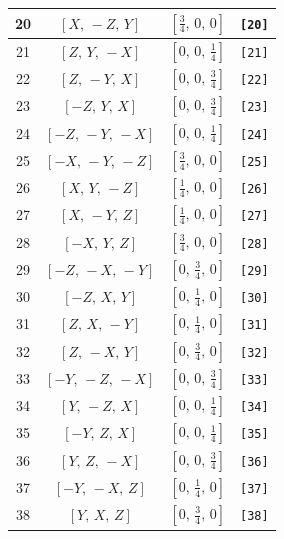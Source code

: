 \documentclass[fleqn,8pt]{jsarticle}
\begin{document}
\begin{longtable}{cccc}
20 & $\left[ X,\, - Z,\, Y \right]$ & $\left[ \frac{3}{4},\, 0,\, 0 \right]$ & {\tt [20]} \\ \hline
21 & $\left[ Z,\, Y,\, - X \right]$ & $\left[ 0,\, 0,\, \frac{1}{4} \right]$ & {\tt [21]} \\ \hline
22 & $\left[ Z,\, - Y,\, X \right]$ & $\left[ 0,\, 0,\, \frac{3}{4} \right]$ & {\tt [22]} \\ \hline
23 & $\left[ - Z,\, Y,\, X \right]$ & $\left[ 0,\, 0,\, \frac{3}{4} \right]$ & {\tt [23]} \\ \hline
24 & $\left[ - Z,\, - Y,\, - X \right]$ & $\left[ 0,\, 0,\, \frac{1}{4} \right]$ & {\tt [24]} \\ \hline
25 & $\left[ - X,\, - Y,\, - Z \right]$ & $\left[ \frac{3}{4},\, 0,\, 0 \right]$ & {\tt [25]} \\ \hline
26 & $\left[ X,\, Y,\, - Z \right]$ & $\left[ \frac{1}{4},\, 0,\, 0 \right]$ & {\tt [26]} \\ \hline
27 & $\left[ X,\, - Y,\, Z \right]$ & $\left[ \frac{1}{4},\, 0,\, 0 \right]$ & {\tt [27]} \\ \hline
28 & $\left[ - X,\, Y,\, Z \right]$ & $\left[ \frac{3}{4},\, 0,\, 0 \right]$ & {\tt [28]} \\ \hline
29 & $\left[ - Z,\, - X,\, - Y \right]$ & $\left[ 0,\, \frac{3}{4},\, 0 \right]$ & {\tt [29]} \\ \hline
30 & $\left[ - Z,\, X,\, Y \right]$ & $\left[ 0,\, \frac{1}{4},\, 0 \right]$ & {\tt [30]} \\ \hline
31 & $\left[ Z,\, X,\, - Y \right]$ & $\left[ 0,\, \frac{1}{4},\, 0 \right]$ & {\tt [31]} \\ \hline
32 & $\left[ Z,\, - X,\, Y \right]$ & $\left[ 0,\, \frac{3}{4},\, 0 \right]$ & {\tt [32]} \\ \hline
33 & $\left[ - Y,\, - Z,\, - X \right]$ & $\left[ 0,\, 0,\, \frac{3}{4} \right]$ & {\tt [33]} \\ \hline
34 & $\left[ Y,\, - Z,\, X \right]$ & $\left[ 0,\, 0,\, \frac{1}{4} \right]$ & {\tt [34]} \\ \hline
35 & $\left[ - Y,\, Z,\, X \right]$ & $\left[ 0,\, 0,\, \frac{1}{4} \right]$ & {\tt [35]} \\ \hline
36 & $\left[ Y,\, Z,\, - X \right]$ & $\left[ 0,\, 0,\, \frac{3}{4} \right]$ & {\tt [36]} \\ \hline
37 & $\left[ - Y,\, - X,\, Z \right]$ & $\left[ 0,\, \frac{1}{4},\, 0 \right]$ & {\tt [37]} \\ \hline
38 & $\left[ Y,\, X,\, Z \right]$ & $\left[ 0,\, \frac{3}{4},\, 0 \right]$ & {\tt [38]} \\ \hline

\end{longtable}
\end{document}
